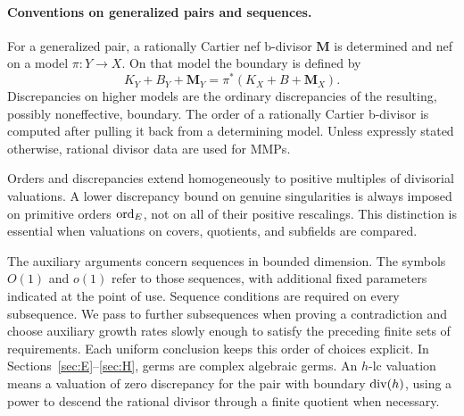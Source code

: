 \paragraph{Conventions on generalized pairs and sequences.}
For a generalized pair, a rationally Cartier nef b-divisor $\mathbf M$ is determined and nef on a model $\pi:Y\to X$. On that model the boundary is defined by
\[
K_Y+B_Y+\mathbf M_Y=\pi^*(K_X+B+\mathbf M_X).
\]
Discrepancies on higher models are the ordinary discrepancies of the resulting, possibly noneffective, boundary. The order of a rationally Cartier b-divisor is computed after pulling it back from a determining model. Unless expressly stated otherwise, rational divisor data are used for MMPs.

Orders and discrepancies extend homogeneously to positive multiples of divisorial valuations. A lower discrepancy bound on genuine singularities is always imposed on primitive orders $\operatorname{ord}_E$, not on all of their positive rescalings. This distinction is essential when valuations on covers, quotients, and subfields are compared.

The auxiliary arguments concern sequences in bounded dimension. The symbols $O(1)$ and $o(1)$ refer to those sequences, with additional fixed parameters indicated at the point of use. Sequence conditions are required on every subsequence. We pass to further subsequences when proving a contradiction and choose auxiliary growth rates slowly enough to satisfy the preceding finite sets of requirements. Each uniform conclusion keeps this order of choices explicit. In Sections~\ref{sec:E}--\ref{sec:H}, germs are complex algebraic germs. An $h$-lc valuation means a valuation of zero discrepancy for the pair with boundary $\operatorname{div}(h)$, using a power to descend the rational divisor through a finite quotient when necessary.
